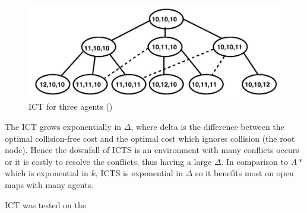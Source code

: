 \documentclass[a4paper,11pt]{article}
\begin{document}
\begin{figure}[!htb]
	\centering
	\centering
	\includegraphics[width=0.9\linewidth]{graphics/ictstree}
	\caption{ICT for three agents (\cite{sharon2011increasing})}
	\label{fig:increasingcosttree}
\end{figure}

The ICT grows exponentially in $\Delta$, where delta is the difference between the optimal collision-free cost and the optimal cost which ignores collision (the root node). Hence the downfall of ICTS is an environment with many conflicts occurs or it is costly to resolve the conflicts, thus having a large $\Delta$. In comparison to $A*$ which is exponential in $k$, ICTS is exponential in $\Delta$ so it benefits most on open maps with many agents.

ICT was tested on the 

%
%
%
%

%
%
\end{document}
